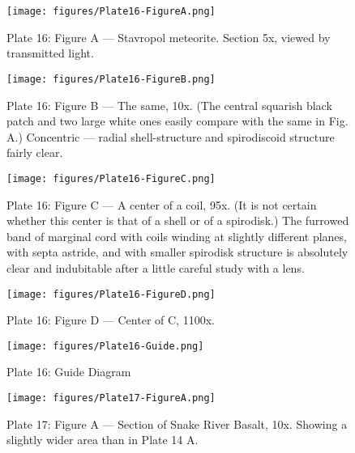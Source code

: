 \documentclass[a4paper, 12pt, oneside]{article}
\begin{document}
\clearpage
{}
\cfoot{\thepage}
\begin{figure}[b]
\centering
\texttt{[image: figures/Plate16-FigureA.png]}
\caption{\small Plate 16: Figure A --- Stavropol meteorite. Section 5x, viewed by transmitted light.}
\end{figure}
\clearpage
\begin{figure}[b]
\centering
\texttt{[image: figures/Plate16-FigureB.png]}
\caption{\small Plate 16: Figure B --- The same, 10x. (The central squarish black patch and two large white ones easily compare with the same in Fig. A.) Concentric --- radial shell-structure and spirodiscoid structure fairly clear.}
\end{figure}
\clearpage
\begin{figure}[b]
\centering
\texttt{[image: figures/Plate16-FigureC.png]}
\caption{\small Plate 16: Figure C --- A center of a coil, 95x. (It is not certain whether this center is that of a shell or of a spirodisk.) The furrowed band of marginal cord with coils winding at slightly different planes, with septa astride, and with smaller spirodisk structure is absolutely clear and indubitable after a little careful study with a lens.}
\end{figure}
\clearpage
\begin{figure}[b]
\centering
\texttt{[image: figures/Plate16-FigureD.png]}
\caption{\small Plate 16: Figure D --- Center of C, 1100x.}
\end{figure}
\clearpage
\begin{figure}[b]
\centering
\texttt{[image: figures/Plate16-Guide.png]}
\caption{\small Plate 16: Guide Diagram}
\end{figure}
\clearpage
{}
\cfoot{\thepage}
\begin{figure}[H]
\centering
\texttt{[image: figures/Plate17-FigureA.png]}
\caption{\small Plate 17: Figure A --- Section of Snake River Basalt, 10x. Showing a slightly wider area than in Plate 14 A.}
\end{figure}
\end{document}
